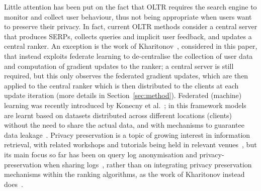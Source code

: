 Little attention has been put on the fact that OLTR requires the search engine to monitor and collect user behaviour, thus not being appropriate when users want to preserve their privacy. In fact, current OLTR methods consider a central server that produces SERPs, collects queries and implicit user feedback, and updates a central ranker. An exception is the work of Kharitonov~\cite{kharitonov2019federated}, considered in this paper, that instead exploits federate learning to de-centralise the collection of user data and computation of gradient updates to the ranker; a central server is still required, but this only observes the federated gradient updates, which are then applied to the central ranker which is then distributed to the clients at each update iteration (more details in Section~\ref{sec:method}). Federated (machine) learning was recently introduced by Konecny et al.~\cite{DBLP:journals/corr/KonecnyMRR16,DBLP:journals/corr/KonecnyMYRSB16}; in this framework models are learnt based on datasets distributed across different locations (clients) without the need to share the actual data, and with mechanisms to guarantee data leakage~\cite{yang2019federated}. 
Privacy preservation is a topic of growing interest in information retrieval, with related workshops and tutorials being held in relevant venues~\cite{yang2016privacy,yang2017differential}, but its main focus so far has been on query log anonymisation and privacy-preservation when sharing logs~\cite{cooper2008survey,korolova2009releasing,zhang2016anonymizing}, rather than on integrating privacy preservation mechanisms within the ranking algorithms, as the work of Kharitonov instead does~\cite{kharitonov2019federated}.